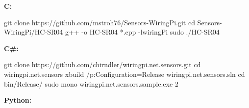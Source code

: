 \textbf{C:} 

\begin{console}
	git clone https://github.com/mstroh76/Sensors-WiringPi.git
	cd Sensors-WiringPi/HC-SR04	
	g++ -o HC-SR04 *.cpp -lwiringPi	
	sudo ./HC-SR04
\end{console}

\textbf{C\#:}

\begin{console}
git clone https://github.com/chirndler/wiringpi.net.sensors.git
cd wiringpi.net.sensors
xbuild /p:Configuration=Release wiringpi.net.sensors.sln
cd bin/Release/
sudo mono wiringpi.net.sensors.sample.exe 2
\end{console}

\textbf{Python:}

\lstset{language=Python, caption=, 
        label=HCSR04Program, frame=single, basicstyle=\ttfamily
	      \footnotesize, breakatwhitespace=false, showstringspaces=false, 
        showtabs=false, tabsize=2 }


